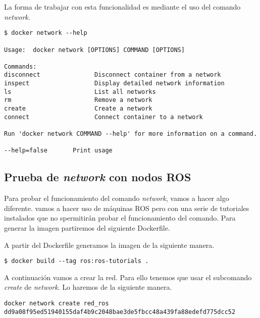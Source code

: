 	La forma de trabajar con esta funcionalidad es mediante el uso del comando \textit{\emph{network}}.
	
	\begin{lstlisting}[style=consola]
$ docker network --help

Usage:	docker network [OPTIONS] COMMAND [OPTIONS]

Commands:
disconnect               Disconnect container from a network
inspect                  Display detailed network information
ls                       List all networks
rm                       Remove a network
create                   Create a network
connect                  Connect container to a network

Run 'docker network COMMAND --help' for more information on a command.

--help=false       Print usage
	\end{lstlisting}
	
	\subsection{Prueba de \textit{network} con nodos ROS}


	Para probar el funcionamiento del comando \emph{network}, vamos a hacer algo diferente. vamos a hacer uso de máquinas ROS pero con una serie de tutoriales instalados que no spermitirán probar el funcionamiento del comando. Para generar la imagen partiremos del siguiente Dockerfile.

	
	
	A partir del Dockerfile generamos la imagen de la siguiente manera.

	\begin{lstlisting}[style=consola]
$ docker build --tag ros:ros-tutorials .
	\end{lstlisting}

	A continuación vamos a crear la red. Para ello tenemos que usar el subcomando \emph{create} de \emph{network}. Lo haremos de la siguiente manera.

	\begin{lstlisting}[style=consola]
docker network create red_ros
dd9a08f95ed51940155daf4b9c2048bae3de5fbcc48a439fa88edefd775dcc52
	\end{lstlisting}
	
